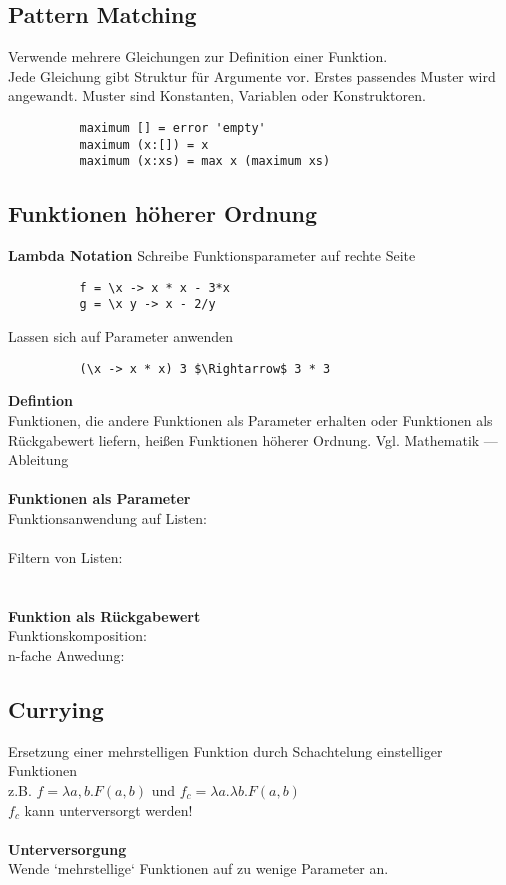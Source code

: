 \subsection{Pattern Matching}%
\label{hsk:sub:pattern-matching}
Verwende mehrere Gleichungen zur Definition einer Funktion.\\
Jede Gleichung gibt Struktur für Argumente vor. Erstes passendes Muster wird angewandt.
Muster sind Konstanten, Variablen oder Konstruktoren.
\begin{lstlisting}
          maximum [] = error 'empty'
          maximum (x:[]) = x
          maximum (x:xs) = max x (maximum xs)
\end{lstlisting}

\subsection{Funktionen höherer Ordnung}%
\label{hsk:sub:funktionen-hoeherer-ordnung}
\textbf{Lambda Notation}
Schreibe Funktionsparameter auf rechte Seite
\begin{lstlisting}
          f = \x -> x * x - 3*x
          g = \x y -> x - 2/y
\end{lstlisting}
        Lassen sich auf Parameter anwenden
\begin{lstlisting}
          (\x -> x * x) 3 $\Rightarrow$ 3 * 3
\end{lstlisting}
\textbf{Defintion}\\
Funktionen, die andere Funktionen als Parameter erhalten oder Funktionen als Rückgabewert liefern, heißen Funktionen höherer Ordnung.
Vgl. Mathematik --- Ableitung\\\\
\textbf{Funktionen als Parameter}\\
Funktionsanwendung auf Listen:\\
\\
Filtern von Listen:\\
\\\\
\textbf{Funktion als Rückgabewert}\\
Funktionskomposition: \\
n-fache Anwedung: 

\subsection{Currying}%
\label{hsk:sub:currying}
Ersetzung einer mehrstelligen Funktion durch Schachtelung einstelliger Funktionen\\
z.B. \(f = \lambda a, b.F(a,b)\) und \(f_c = \lambda a.\lambda b. F(a, b)\)\\
\(f_c\) kann unterversorgt werden!\\\\
\textbf{Unterversorgung}\\
Wende `mehrstellige` Funktionen auf zu wenige Parameter an.

